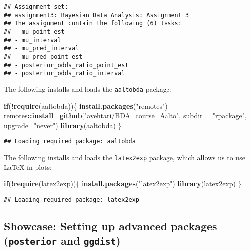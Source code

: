 \documentclass[
]{article}
\newenvironment{Shaded}{\begin{snugshade}}{\end{snugshade}}
\newcommand{\AttributeTok}[1]{\textcolor[rgb]{0.13,0.29,0.53}{#1}}
\newcommand{\ControlFlowTok}[1]{\textcolor[rgb]{0.13,0.29,0.53}{\textbf{#1}}}
\newcommand{\FunctionTok}[1]{\textcolor[rgb]{0.13,0.29,0.53}{\textbf{#1}}}
\newcommand{\NormalTok}[1]{#1}
\newcommand{\SpecialCharTok}[1]{\textcolor[rgb]{0.81,0.36,0.00}{\textbf{#1}}}
\newcommand{\StringTok}[1]{\textcolor[rgb]{0.31,0.60,0.02}{#1}}
\begin{document}
\begin{verbatim}
## Assignment set:
## assignment3: Bayesian Data Analysis: Assignment 3
## The assignment contain the following (6) tasks:
## - mu_point_est
## - mu_interval
## - mu_pred_interval
## - mu_pred_point_est
## - posterior_odds_ratio_point_est
## - posterior_odds_ratio_interval
\end{verbatim}

The following installs and loads the \texttt{aaltobda} package:

\begin{Shaded}
\begin{Highlighting}[]
\ControlFlowTok{if}\NormalTok{(}\SpecialCharTok{!}\FunctionTok{require}\NormalTok{(aaltobda))\{}
    \FunctionTok{install.packages}\NormalTok{(}\StringTok{"remotes"}\NormalTok{)}
\NormalTok{    remotes}\SpecialCharTok{::}\FunctionTok{install\_github}\NormalTok{(}\StringTok{"avehtari/BDA\_course\_Aalto"}\NormalTok{, }\AttributeTok{subdir =} \StringTok{"rpackage"}\NormalTok{, }\AttributeTok{upgrade=}\StringTok{"never"}\NormalTok{)}
    \FunctionTok{library}\NormalTok{(aaltobda)}
\NormalTok{\}}
\end{Highlighting}
\end{Shaded}

\begin{verbatim}
## Loading required package: aaltobda
\end{verbatim}

The following installs and loads the
\href{https://github.com/stefano-meschiari/latex2exp}{\texttt{latex2exp}
package}, which allows us to use LaTeX in plots:

\begin{Shaded}
\begin{Highlighting}[]
\ControlFlowTok{if}\NormalTok{(}\SpecialCharTok{!}\FunctionTok{require}\NormalTok{(latex2exp))\{}
    \FunctionTok{install.packages}\NormalTok{(}\StringTok{"latex2exp"}\NormalTok{)}
    \FunctionTok{library}\NormalTok{(latex2exp)}
\NormalTok{\}}
\end{Highlighting}
\end{Shaded}

\begin{verbatim}
## Loading required package: latex2exp
\end{verbatim}

\hypertarget{showcase-setting-up-advanced-packages-posterior-and-ggdist}{%
\subsection{\texorpdfstring{Showcase: Setting up advanced packages
(\texttt{posterior} and
\texttt{ggdist})}{Showcase: Setting up advanced packages (posterior and ggdist)}}\label{showcase-setting-up-advanced-packages-posterior-and-ggdist}}
\end{document}
